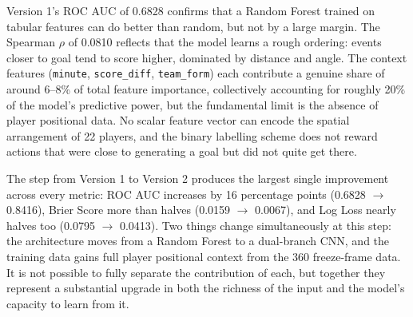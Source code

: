\documentclass{article}
\begin{document}
%
%
%
%
Version 1's ROC AUC of 0.6828 confirms that a Random Forest trained on tabular features can do better than random, but not by a large margin. The Spearman $\rho$ of 0.0810 reflects that the model learns a rough ordering: events closer to goal tend to score higher, dominated by distance and angle. The context features (\texttt{minute}, \texttt{score\_diff}, \texttt{team\_form}) each contribute a genuine share of around 6--8\% of total feature importance, collectively accounting for roughly 20\% of the model's predictive power, but the fundamental limit is the absence of player positional data. No scalar feature vector can encode the spatial arrangement of 22 players, and the binary labelling scheme does not reward actions that were close to generating a goal but did not quite get there.

The step from Version 1 to Version 2 produces the largest single improvement across every metric: ROC AUC increases by 16 percentage points (0.6828 $\to$ 0.8416), Brier Score more than halves (0.0159 $\to$ 0.0067), and Log Loss nearly halves too (0.0795 $\to$ 0.0413). Two things change simultaneously at this step: the architecture moves from a Random Forest to a dual-branch CNN, and the training data gains full player positional context from the 360 freeze-frame data. It is not possible to fully separate the contribution of each, but together they represent a substantial upgrade in both the richness of the input and the model's capacity to learn from it.
\end{document}
